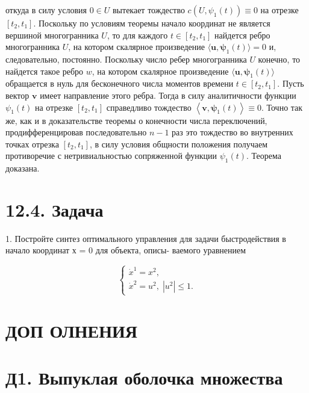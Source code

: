 \documentclass[8pt]{extarticle}
\begin{document}
откуда в силу условия \(0 \in U\) вытекает тождество \(c\left( {U,{\psi }_{1}\left( t\right) }\right)  \equiv  0\) на отрезке \(\left\lbrack  {{t}_{2},{t}_{1}}\right\rbrack\). Поскольку по условиям теоремы начало координат не является вершиной многогранника \(U\), то для каждого \(t \in  \left\lbrack  {{t}_{2},{t}_{1}}\right\rbrack\) найдется ребро многогранника \(U\), на котором скалярное произведение \(\langle \mathbf{u},{\mathbf{\psi }}_{1}\left( t\right) \rangle  = 0\) и, следовательно, постоянно. Поскольку число ребер многогранника \(U\) конечно, то найдется такое ребро \(w\), на котором скалярное произведение \(\langle \mathbf{u},{\mathbf{\psi }}_{1}\left( t\right) \rangle\) обращается в нуль для бесконечного числа моментов времени \(t \in  \left\lbrack  {{t}_{2},{t}_{1}}\right\rbrack\). Пусть вектор \(\mathbf{v}\) имеет направление этого ребра. Тогда в силу аналитичности функции \({\psi }_{1}\left( t\right)\) на отрезке \(\left\lbrack  {{t}_{2},{t}_{1}}\right\rbrack\) справедливо тождество \(\left\langle  {\mathbf{v},{\mathbf{\psi }}_{1}\left( t\right) }\right\rangle   \equiv  0\). Точно так же, как и в доказательстве теоремы о конечности числа переключений, продифференцировав последовательно \(n - 1\) раз это тождество во внутренних точках отрезка \(\left\lbrack  {{t}_{2},{t}_{1}}\right\rbrack\), в силу условия общности положения получаем противоречие с нетривиальностью сопряженной функции \({\psi }_{1}\left( t\right)\). Теорема доказана.

\section*{12.4. Задача}

1. Постройте синтез оптимального управления для задачи быстродействия в начало координат х = 0 для объекта, описы- ваемого уравнением

\[
\left\{  \begin{array}{l} {\dot{x}}^{1} = {x}^{2}, \\  {\dot{x}}^{2} = {u}^{2},\;\left| {u}^{2}\right|  \leq  1. \end{array}\right.
\]

\section*{ДОП ОЛНЕНИЯ}

\section*{Д1. Выпуклая оболочка множества}
\end{document}
